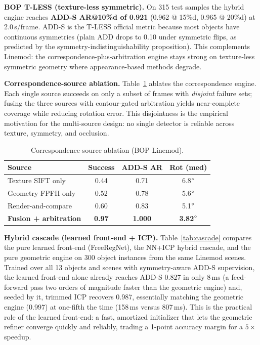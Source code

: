 \documentclass[9pt,twoside,web]{ieeecolor2}
\begin{document}
\textbf{BOP T-LESS (texture-less symmetric).} On 315 test samples the hybrid engine reaches \textbf{ADD-S AR@10\%d of 0.921} (0.962 @ 15\%d, 0.965 @ 20\%d) at 2.0\,s/frame. ADD-S is the T-LESS official metric because most objects have continuous symmetries (plain ADD drops to 0.10 under symmetric flips, as predicted by the symmetry-indistinguishability proposition). This complements Linemod: the correspondence-plus-arbitration engine stays strong on texture-less symmetric geometry where appearance-based methods degrade.

\textbf{Correspondence-source ablation.} Table~\ref{tab:ablation} ablates the correspondence engine. Each single source succeeds on only a subset of frames with \emph{disjoint} failure sets; fusing the three sources with contour-gated arbitration yields near-complete coverage while reducing rotation error. This disjointness is the empirical motivation for the multi-source design: no single detector is reliable across texture, symmetry, and occlusion.

\begin{table}[t]
\centering
\caption{Correspondence-source ablation (BOP Linemod).}
\label{tab:ablation}
\begin{tabular}{lccc}
\toprule
Source & Success & ADD-S AR & Rot (med) \\
\midrule
Texture SIFT only & 0.44 & 0.71 & 6.8$\degree$ \\
Geometry FPFH only & 0.52 & 0.78 & 5.6$\degree$ \\
Render-and-compare & 0.60 & 0.83 & 5.1$\degree$ \\
\textbf{Fusion + arbitration} & \textbf{0.97} & \textbf{1.000} & \textbf{3.82}$\degree$ \\
\bottomrule
\end{tabular}
\end{table}

\textbf{Hybrid cascade (learned front-end + ICP).} Table~\ref{tab:cascade} compares the pure learned front-end (FreeRegNet), the NN+ICP hybrid cascade, and the pure geometric engine on 300 object instances from the same Linemod scenes. Trained over all 13 objects and scenes with symmetry-aware ADD-S supervision, the learned front-end alone already reaches ADD-S 0.827 in only 8\,ms (a feed-forward pass two orders of magnitude faster than the geometric engine) and, seeded by it, trimmed ICP recovers 0.987, essentially matching the geometric engine (0.997) at one-fifth the time (158\,ms versus 807\,ms). This is the practical role of the learned front-end: a fast, amortized initializer that lets the geometric refiner converge quickly and reliably, trading a 1-point accuracy margin for a $5\times$ speedup.
\end{document}
